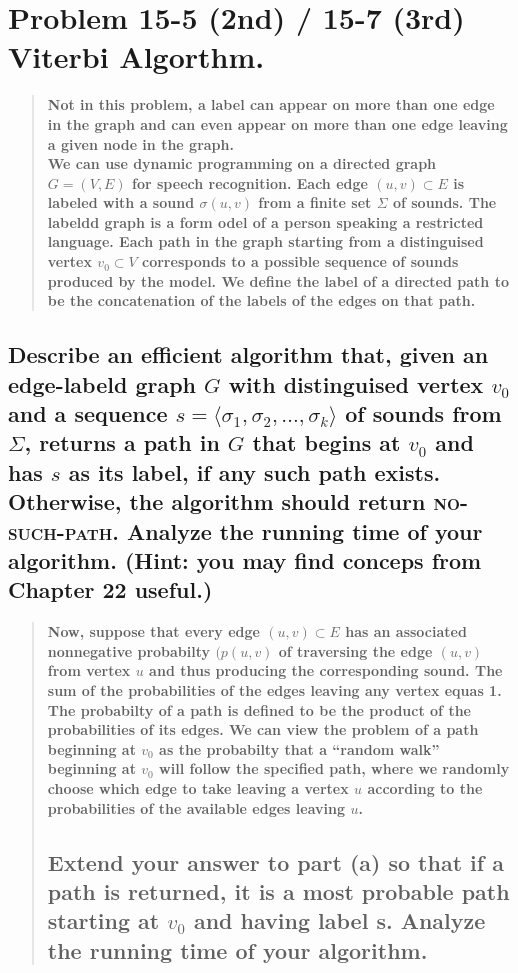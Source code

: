 \documentclass[titlepage]{article}\usepackage[]{graphicx}\usepackage[]{color}
\begin{document}
\section{Problem 15-5 (2nd) / 15-7 (3rd) Viterbi Algorthm. }
\begin{quote}
  \textbf{Not in this problem, a label can appear on more than one edge in the graph
  and can even appear on more than one edge leaving a given node in the graph.
  \\
  We can use dynamic programming on a directed graph $G = (V,E)$ for speech
  recognition. Each edge $(u,v) \subset E$ is labeled with a sound
  $\sigma(u,v)$ from a finite set $\Sigma$ of sounds. The labeldd graph is a
  form odel of a person speaking a restricted language. Each path in the graph
  starting from a distinguised vertex $v_0 \subset V$ corresponds to a possible
  sequence of sounds produced by the model. We define the label of a directed
path to be the concatenation of the labels of the edges on that path. }
\end{quote}
\subsection{ Describe an efficient algorithm that, given an edge-labeld graph
  $G$ with distinguised vertex $v_0$ and a sequence $s = \langle \sigma_1,
  \sigma_2, \dots, \sigma_k \rangle$ of sounds from $\Sigma$, returns a path in
  $G$ that begins at $v_0$ and has $s$ as its label, if any such path exists.
  Otherwise, the algorithm should return \textsc{no-such-path}. Analyze the
  running time of your algorithm. (Hint: you may find conceps from Chapter 22
useful.)}

  \begin{quote}
	\textbf{Now, suppose that every edge $(u,v) \subset E$ has an associated
	nonnegative probabilty $(p(u,v)$ of traversing the edge $(u,v)$ from
	vertex $u$ and thus producing the corresponding sound. The sum of the
	probabilities of the edges leaving any vertex equas 1. The probabilty of
	a path is defined to be the product of the probabilities of its edges. We
	can view the problem of a path beginning at $v_0$ as the probabilty that a
	``random walk'' beginning at $v_0$  will follow the specified path, where
	we randomly choose which edge to take leaving a vertex  $u$ according to
  the probabilities of the available edges leaving $u$. }
	\subsection{Extend your answer to part (a) so that if a path is returned,
	  it is a most probable path starting at $v_0$ and having label s. Analyze
	the running time of your algorithm. }
  \end{quote}
\end{document}
